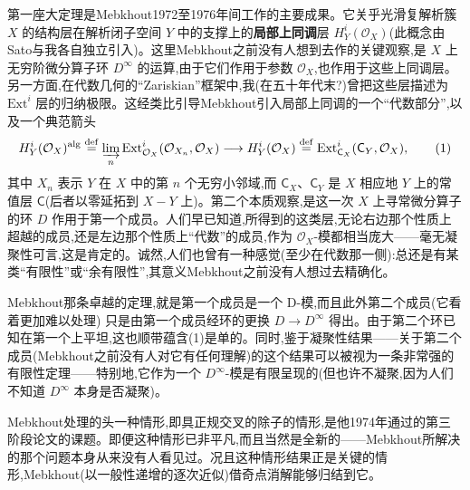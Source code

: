 \noindent 第一座大定理是Mebkhout1972至1976年间工作的主要成果。它关乎光滑复解析簇 $X$ 的结构层在解析闭子空间 $Y$ 中的支撑上的\textbf{局部上同调}层 $H^{i}_{Y}(\mathcal{O}_{X})$(此概念由Sato与我各自独立引入)。这里Mebkhout之前没有人想到去作的关键观察,是 $X$ 上无穷阶微分算子环 $D^{\infty}$ 的运算,由于它们\dmark{}作用于参数 $\mathcal{O}_{X}$,也作用于这些上同调层。另一方面,在代数几何的“Zariskian”框架中,我(在五十年代末?)曾把这些层描述为 $\mathrm{Ext}^{i}$ 层的归纳极限。这经类比引导Mebkhout引入局部上同调的一个“代数部分”,以及一个典范箭头
\begin{equation*}
H^{i}_{Y}(\mathcal{O}_{X})^{\mathrm{alg}}\overset{\mathrm{def}}{=}\varinjlim_{n}\mathrm{Ext}^{i}_{\mathcal{O}_{X}}(\mathcal{O}_{X_{n}},\mathcal{O}_{X})\longrightarrow H^{i}_{Y}(\mathcal{O}_{X})\overset{\mathrm{def}}{=}\mathrm{Ext}^{i}_{\mathsf{C}_{X}}(\mathsf{C}_{Y},\mathcal{O}_{X}),
\tag{1}
\end{equation*}
其中 $X_{n}$ 表示 $Y$ 在 $X$ 中的第 $n$ 个无穷小邻域,而 $\mathsf{C}_{X}$、$\mathsf{C}_{Y}$ 是 $X$ 相应地 $Y$ 上的常值层 $\mathsf{C}$(后者以零延拓到 $X-Y$ 上)。第二个本质观察,是这一次 $X$ 上寻常微分算子的环 $D$ 作用于第一个成员。人们早已知道,所得到的这类层,无论右边那个性质上超越的成员,还是左边那个性质上“代数”的成员,作为 $\mathcal{O}_{X}$-模都相当庞大——毫无凝聚性可言,这是肯定的。诚然,人们也曾有一种感觉(至少在代数那一侧):总还是有某类“有限性”或“余有限性”,其意义Mebkhout之前没有人想过去精确化。

\noindent Mebkhout那条卓越的定理,就是第一个成员是一个 D-模,而且此外第二个成员(它看着更加难以处理) 只是由第一个成员经环的更换 $D\longrightarrow D^{\infty}$ 得出。由于第二个环已知在第一个上平坦,这也顺带蕴含(1)是单的。\noindent 同时,鉴于凝聚性结果——关于第二个成员(Mebkhout之前没有人对它有任何理解)的这个结果可以被视为一条非常强的有限性定理——特别地,它作为一个 $D^{\infty}$-模是有限呈现的(但也许不凝聚,因为人们不知道 $D^{\infty}$ 本身是否凝聚)。

\noindent Mebkhout处理的头一种情形,即具正规交叉的除子的情形,是他1974年通过的第三阶段论文的课题。即便这种情形已非平凡,而且当然是全新的——Mebkhout所解决的那个问题本身从来没有人看见过。况且这种情形结果正是关键的情形,Mebkhout(以一般性递增的逐次近似)借奇点消解能够归结到它。

